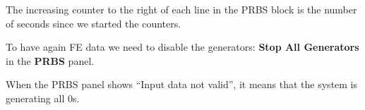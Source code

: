 \begin{leftbar}
    The increasing counter to the right of each line in the PRBS block is the
    number of seconds since we started the counters.
\end{leftbar}

\begin{leftbar}
    To have again FE data we need to disable the generators:
    \textbf{Stop All Generators} in the \textbf{PRBS} panel.
\end{leftbar}

\begin{leftbar}
    When the PRBS panel shows ``Input data not valid'', it means that the
    system is generating all 0s.
\end{leftbar}
